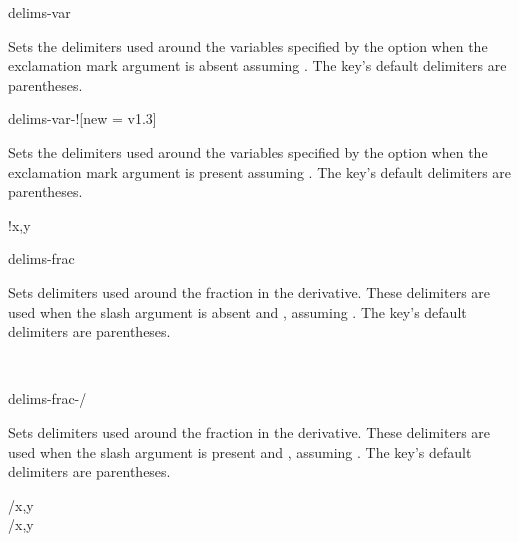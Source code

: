 \begin{option}{delims-var}
	\begin{values}[default = (~)]
	\end{values}
	Sets the delimiters used around the variables specified by the  option when the exclamation mark argument is absent assuming . The key's default delimiters are parentheses.
	\begin{example}
	\end{example}
\end{option}

\begin{option}{delims-var-!}[new = v1.3]
	\begin{values}[default = (~)]
		\meta{right delimiter}
	\end{values}
	Sets the delimiters used around the variables specified by the  option when the exclamation mark argument is present assuming . The key's default delimiters are parentheses.
	\begin{example}
		!{x,y}
	\end{example}
\end{option}

\begin{option}{delims-frac}
	\begin{values}[default = (~)]
	\end{values}
	Sets delimiters used around the fraction in the derivative. These delimiters are used when the slash argument is absent and , assuming . The key's default delimiters are parentheses.
	\begin{example}
		\pdv[delims-frac=||, frac]{f}{x,y} \\
		\pdv*[delims-frac=||, frac=true]{y}{x}
	\end{example}
\end{option}

\begin{option}{delims-frac-/}
	\begin{values}[default = (~)]
	\end{values}
	Sets delimiters used around the fraction in the derivative. These delimiters are used when the slash argument is present and , assuming . The key's default delimiters are parentheses.
	\begin{example}
		/{x,y} \\
		/{x,y}
	\end{example}
\end{option}


